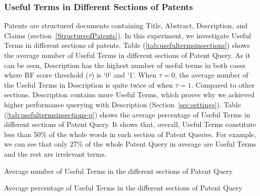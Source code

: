 \subsubsection{Useful Terms in Different Sections of Patents}
Patents are structured documents containing Title, Abstract, Description, and Claims (section~\ref{StructureofPatents}). In this experiment, we investigate Useful Terms in different sections of patents. 
Table (\ref{tab:usefultermsinsections}) shows the average number of Useful Terms in different sections of Patent Query.  
As it can be seen, Description has the highest number of useful terms in both cases where RF score threshold ($ \tau $) is `0' and `1'. When $ \tau = 0 $, the average number of the Useful Terms in Description is quite twice of when $ \tau = 1 $. Compared to other sections, Description contains more Useful Terms, which proves why we achieved higher performance querying with Description (Section~\ref{sec:settings}).
Table (\ref{tab:usefultermsinsections-p}) shows the average percentage of Useful Terms in different sections of Patent Query. It shows that, overall, Useful Terms constitute less than 50\% of the whole words in each section of Patent Queries. For example, we can see that only 27\% of the whole Patent Query in average are Useful Terms and the rest are irrelevant terms. 

\begin{table}[t!]
  \begin{center}
   \caption{Average number of Useful Terms in the different sections of Patent Query}
     
  \label{tab:usefultermsinsections}
  \end{center}  
\end{table}
\begin{table}[t!]
  \begin{center}
   \caption{Average percentage of Useful Terms in the different sections of Patent Query}
     
  \label{tab:usefultermsinsections-p}
  \end{center}  
\end{table}

